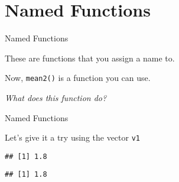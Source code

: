 \section{Named Functions}\label{named-functions}

\begin{frame}[fragile]{Named Functions}

These are functions that you assign a name to.

\begin{Shaded}
\begin{Highlighting}[]
\StringTok{ }
\StringTok{ }
\StringTok{ }\NormalTok{(}\OperatorTok{/}\OperatorTok{*}\StringTok{ }
\NormalTok{\}}
\end{Highlighting}
\end{Shaded}

Now, \texttt{mean2()} is a function you can use.

\emph{What does this function do?}

\end{frame}

\begin{frame}[fragile]{Named Functions}

\begin{Shaded}
\begin{Highlighting}[]
\StringTok{ }\NormalTok{(}\NormalTok{,}\NormalTok{,}\NormalTok{,}\NormalTok{,}\NormalTok{,}\NormalTok{,}\NormalTok{,}\NormalTok{,}\NormalTok{,}
\end{Highlighting}
\end{Shaded}

Let's give it a try using the vector \texttt{v1}

\begin{Shaded}
\begin{Highlighting}[]
\end{Highlighting}
\end{Shaded}

\begin{verbatim}
## [1] 1.8
\end{verbatim}

\begin{Shaded}
\begin{Highlighting}[]
\end{Highlighting}
\end{Shaded}

\begin{verbatim}
## [1] 1.8
\end{verbatim}

\end{frame}

